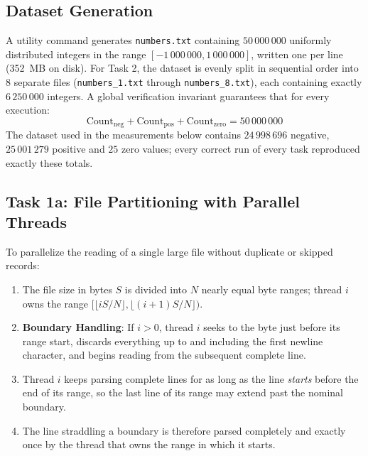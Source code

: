 \documentclass[11pt,a4paper]{article}
\begin{document}
\subsection{Dataset Generation}
A utility command generates \texttt{numbers.txt} containing $50\,000\,000$ uniformly distributed integers in the range $[-1\,000\,000, 1\,000\,000]$, written one per line (352~MB on disk). For Task 2, the dataset is evenly split in sequential order into 8 separate files (\texttt{numbers\_1.txt} through \texttt{numbers\_8.txt}), each containing exactly $6\,250\,000$ integers. A global verification invariant guarantees that for every execution:
\begin{equation}
    \text{Count}_{\text{neg}} + \text{Count}_{\text{pos}} + \text{Count}_{\text{zero}} = 50\,000\,000
\end{equation}
The dataset used in the measurements below contains $24\,998\,696$ negative, $25\,001\,279$ positive and $25$ zero values; every correct run of every task reproduced exactly these totals.

\subsection{Task 1a: File Partitioning with Parallel Threads}
To parallelize the reading of a single large file without duplicate or skipped records:
\begin{enumerate}
    \item The file size in bytes $S$ is divided into $N$ nearly equal byte ranges; thread $i$ owns the range $[\lfloor iS/N \rfloor, \lfloor (i+1)S/N \rfloor)$.
    \item \textbf{Boundary Handling}: If $i > 0$, thread $i$ seeks to the byte just before its range start, discards everything up to and including the first newline character, and begins reading from the subsequent complete line.
    \item Thread $i$ keeps parsing complete lines for as long as the line \emph{starts} before the end of its range, so the last line of its range may extend past the nominal boundary.
    \item The line straddling a boundary is therefore parsed completely and exactly once by the thread that owns the range in which it starts.
\end{enumerate}
\end{document}
